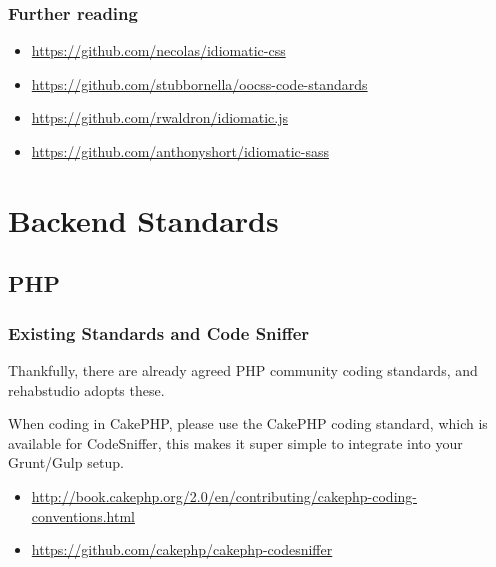 \documentclass[letterpaper,10pt,english]{sphinxmanual}
\begin{document}
\subsubsection{Further reading}
\label{coding_standards/frontend_standards:further-reading}\begin{itemize}
\item {} 
\href{https://github.com/necolas/idiomatic-css}{https://github.com/necolas/idiomatic-css}

\item {} 
\href{https://github.com/stubbornella/oocss-code-standards}{https://github.com/stubbornella/oocss-code-standards}

\item {} 
\href{https://github.com/rwaldron/idiomatic.js}{https://github.com/rwaldron/idiomatic.js}

\item {} 
\href{https://github.com/anthonyshort/idiomatic-sass}{https://github.com/anthonyshort/idiomatic-sass}

\end{itemize}


\section{Backend Standards}
\label{coding_standards/backend_standards:backend-standards}\label{coding_standards/backend_standards::doc}

\subsection{PHP}
\label{coding_standards/backend_standards:php}

\subsubsection{Existing Standards and Code Sniffer}
\label{coding_standards/backend_standards:existing-standards-and-code-sniffer}
Thankfully, there are already agreed PHP community coding standards, and rehabstudio adopts these.

When coding in CakePHP, please use the CakePHP coding standard, which is available for CodeSniffer, this makes it super simple to integrate into your Grunt/Gulp setup.
\begin{itemize}
\item {} 
\href{http://book.cakephp.org/2.0/en/contributing/cakephp-coding-conventions.html}{http://book.cakephp.org/2.0/en/contributing/cakephp-coding-conventions.html}

\item {} 
\href{https://github.com/cakephp/cakephp-codesniffer}{https://github.com/cakephp/cakephp-codesniffer}

\end{itemize}
\end{document}

